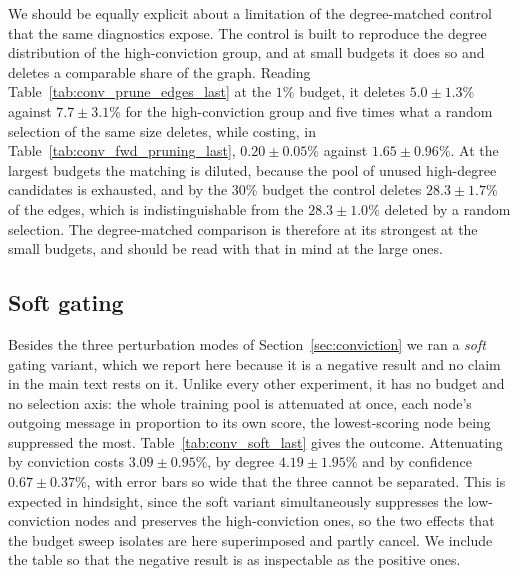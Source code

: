 We should be equally explicit about a limitation of the degree-matched control
that the same diagnostics expose. The control is built to reproduce the degree
distribution of the high-conviction group, and at small budgets it does so and
deletes a comparable share of the graph. Reading
Table~\ref{tab:conv_prune_edges_last} at the $1\%$ budget, it deletes
$5.0 \pm 1.3\%$ against $7.7 \pm 3.1\%$ for the high-conviction group and five
times what a random selection of the same size deletes, while costing, in
Table~\ref{tab:conv_fwd_pruning_last}, $0.20 \pm 0.05\%$ against
$1.65 \pm 0.96\%$. At the largest budgets the matching is diluted,
because the pool of unused high-degree candidates is exhausted, and by the
$30\%$ budget the control deletes $28.3 \pm 1.7\%$ of the edges, which is
indistinguishable from the $28.3 \pm 1.0\%$ deleted by a random selection. The
degree-matched comparison is therefore at its strongest at the small budgets,
and should be read with that in mind at the large ones.







\subsection{Soft gating}
\label{sec:supp_soft}

Besides the three perturbation modes of Section~\ref{sec:conviction} we ran a
\emph{soft} gating variant, which we report here because it is a negative
result and no claim in the main text rests on it. Unlike every other experiment,
it has no budget and no selection axis: the whole training pool is attenuated at
once, each node's outgoing message in proportion to its own score, the
lowest-scoring node being suppressed the most. Table~\ref{tab:conv_soft_last}
gives the outcome. Attenuating by conviction costs $3.09 \pm 0.95\%$, by degree
$4.19 \pm 1.95\%$ and by confidence $0.67 \pm 0.37\%$, with error bars so wide
that the three cannot be separated. This is expected in hindsight, since the
soft variant simultaneously suppresses the low-conviction nodes and preserves
the high-conviction ones, so the two effects that the budget sweep isolates are
here superimposed and partly cancel. We include the table so that the negative
result is as inspectable as the positive ones.


